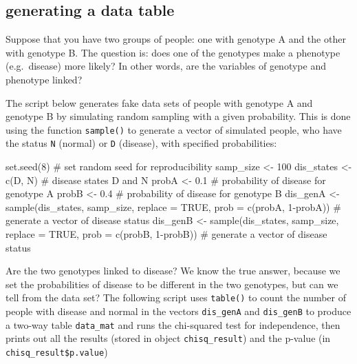 \documentclass[
  letterpaper,
  DIV=11,
  numbers=noendperiod]{scrreprt}
\newenvironment{Shaded}{\begin{snugshade}}{\end{snugshade}}
\newcommand{\NormalTok}[1]{\textcolor[rgb]{0.00,0.23,0.31}{#1}}
\begin{document}
\hypertarget{generating-a-data-table}{%
\subsection*{generating a data table}\label{generating-a-data-table}}

Suppose that you have two groups of people: one with genotype A and the
other with genotype B. The question is: does one of the genotypes make a
phenotype (e.g.~disease) more likely? In other words, are the variables
of genotype and phenotype linked?

The script below generates fake data sets of people with genotype A and
genotype B by simulating random sampling with a given probability. This
is done using the function \texttt{sample()} to generate a vector of
simulated people, who have the status \texttt{N} (normal) or \texttt{D}
(disease), with specified probabilities:

\begin{Shaded}
\begin{Highlighting}[]
\NormalTok{set.seed(8) \# set random seed for reproducibility}
\NormalTok{samp\_size \textless{}{-} 100 }
\NormalTok{dis\_states \textless{}{-} c(\textquotesingle{}D\textquotesingle{}, \textquotesingle{}N\textquotesingle{}) \# disease states \textquotesingle{}D\textquotesingle{} and \textquotesingle{}N\textquotesingle{}}
\NormalTok{probA \textless{}{-} 0.1 \# probability of disease for genotype A}
\NormalTok{probB \textless{}{-} 0.4 \# probability of disease for genotype B}
\NormalTok{dis\_genA \textless{}{-} sample(dis\_states, samp\_size, replace = TRUE, prob = c(probA, 1{-}probA)) \# generate a vector of disease status}
\NormalTok{dis\_genB \textless{}{-} sample(dis\_states, samp\_size, replace = TRUE, prob = c(probB, 1{-}probB)) \# generate a vector of disease status}
\end{Highlighting}
\end{Shaded}

Are the two genotypes linked to disease? We know the true answer,
because we set the probabilities of disease to be different in the two
genotypes, but can we tell from the data set? The following script uses
\texttt{table()} to count the number of people with disease and normal
in the vectors \texttt{dis\_genA} and \texttt{dis\_genB} to produce a
two-way table \texttt{data\_mat} and runs the chi-squared test for
independence, then prints out all the results (stored in object
\texttt{chisq\_result}) and the p-value (in
\texttt{chisq\_result\$p.value})
\end{document}

